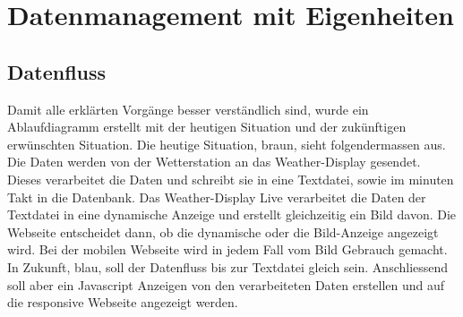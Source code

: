 \section{Datenmanagement mit Eigenheiten}

\subsection{Datenfluss}
Damit alle erklärten Vorgänge besser verständlich sind, wurde ein Ablaufdiagramm erstellt mit der heutigen Situation und der zukünftigen erwünschten Situation. Die heutige Situation, braun,  sieht folgendermassen aus. Die Daten werden von der Wetterstation an das Weather-Display gesendet. Dieses verarbeitet die Daten und schreibt sie in eine Textdatei, sowie im minuten Takt in die Datenbank. Das Weather-Display Live verarbeitet die Daten der Textdatei in eine dynamische Anzeige und erstellt gleichzeitig ein Bild davon. Die Webseite entscheidet dann, ob die dynamische oder die Bild-Anzeige angezeigt wird. Bei der mobilen Webseite wird in jedem Fall vom Bild Gebrauch gemacht. \\
In Zukunft, blau, soll der Datenfluss bis zur Textdatei gleich sein. Anschliessend soll aber ein Javascript Anzeigen von den verarbeiteten Daten erstellen und auf die responsive Webseite angezeigt werden.\\






